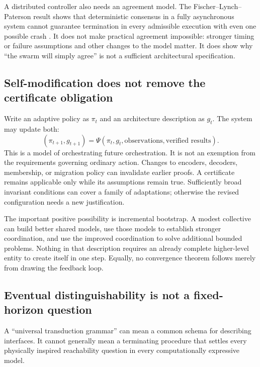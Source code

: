 \documentclass[11pt,a4paper]{article}
\theoremstyle{definition}
\theoremstyle{remark}
\begin{document}
A distributed controller also needs an agreement model. The Fischer--Lynch--Paterson result shows that deterministic consensus in a fully asynchronous system cannot guarantee termination in every admissible execution with even one possible crash \citep{flp}. It does not make practical agreement impossible: stronger timing or failure assumptions and other changes to the model matter. It does show why ``the swarm will simply agree'' is not a sufficient architectural specification.

\subsection{Self-modification does not remove the certificate obligation}
Write an adaptive policy as $\pi_t$ and an architecture description as $g_t$. The system may update both:
\[
 (\pi_{t+1},g_{t+1})=\Psi(\pi_t,g_t,\text{observations},\text{verified results}).
\]
This is a model of orchestrating future orchestration. It is not an exemption from the requirements governing ordinary action. Changes to encoders, decoders, membership, or migration policy can invalidate earlier proofs. A certificate remains applicable only while its assumptions remain true. Sufficiently broad invariant conditions can cover a family of adaptations; otherwise the revised configuration needs a new justification.

The important positive possibility is incremental bootstrap. A modest collective can build better shared models, use those models to establish stronger coordination, and use the improved coordination to solve additional bounded problems. Nothing in that description requires an already complete higher-level entity to create itself in one step. Equally, no convergence theorem follows merely from drawing the feedback loop.

\subsection{Eventual distinguishability is not a fixed-horizon question}
A ``universal transduction grammar'' can mean a common schema for describing interfaces. It cannot generally mean a terminating procedure that settles every physically inspired reachability question in every computationally expressive model.
\end{document}
